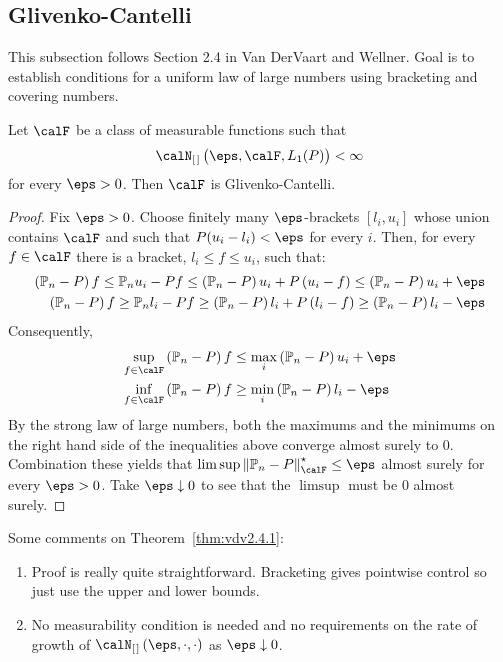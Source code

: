 
\subsection{Glivenko-Cantelli}%

This subsection follows Section 2.4 in Van DerVaart and Wellner. Goal is to establish conditions for a uniform law of large numbers using bracketing and covering numbers.

\begin{theorem}
	\label{thm:vdv2.4.1}
	Let \(\calF\) be a class of measurable functions such that  \[\calN_{[\hspace{0.1em}]}\left(\eps,\calF,L_1(P)\right)<\infty\] for every \(\eps>0\). Then  \(\calF\) is Glivenko-Cantelli. 
\end{theorem}
\begin{proof}
	Fix \(\eps > 0\). Choose finitely many \(\eps\)-brackets \([l_i,u_i]\) whose union contains \(\calF\) and such that \(P(u_i-l_i)<\eps\) for every \(i\). Then, for every \(f\in\calF\) there is a bracket, \(l_i \leq f \leq u_i \), such that:
	\begin{align*}
		\left(\P_n-P\right)f \leq \P_n u_i - Pf\leq \left(\P_n-P\right)u_i + P\left(u_i - f\right) \leq \left(\P_n-P\right)u_i + \eps \\ 
		\left(\P_n-P\right)f \geq \P_n l_i - Pf\geq \left(\P_n-P\right)l_i + P\left(l_i - f\right) \geq \left(\P_n-P\right)l_i - \eps 
	\end{align*}
	Consequently,
	\begin{align*}
			\sup_{f\in\calF}\left(\P_n-P\right)f &\leq \max_i \left(\P_n-P\right)u_i + \eps \\
			\inf_{f\in\calF}\left(\P_n-P\right)f &\geq \min_i \left(\P_n-P\right)l_i -\eps
	\end{align*}
	By the strong law of large numbers, both the maximums and the minimums on the right hand side of the inequalities above converge almost surely to 0. Combination these yields that \(\lim\sup\left\|\P_n-P\right\|^\star_\calF \leq \eps\) almost surely for every \(\eps > 0\). Take  \(\eps\downarrow 0\) to see that the \(\limsup\) must be  \(0\) almost surely. 
\end{proof}
\begin{remark*}
	Some comments on Theorem~\ref{thm:vdv2.4.1}:
	\begin{enumerate}
		\item Proof is really quite straightforward. Bracketing gives pointwise control so just use the upper and lower bounds.
		\item No measurability condition is needed and no requirements on the rate of growth of \(\calN_{[\hspace{0.1em}]}\left(\eps,\cdot,\cdot\right)\) as \(\eps\downarrow 0\).
	\end{enumerate}
\end{remark*}
